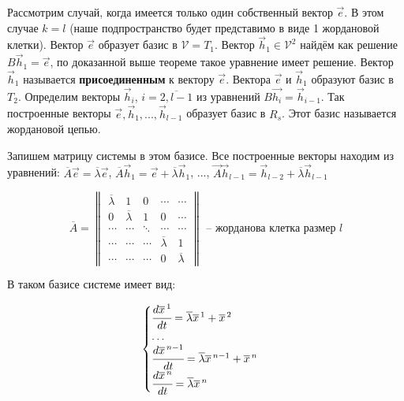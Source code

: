 Рассмотрим случай, когда имеется только один собственный вектор $\overrightarrow{e}$. В этом случае $k = l$ (наше подпространство будет представимо в виде 1 жордановой клетки). 
Вектор $\overrightarrow{e}$ образует базис в $\mathcal{V} = T_1$. Вектор $\overrightarrow{h}_1 \in \mathcal{V}^2$ найдём как решение $B \overrightarrow{h}_1 = \overrightarrow{e}$, по доказанной выше теореме такое уравнение имеет решение. 
Вектор $\overrightarrow{h}_1$ называется \textbf{присоединенным} к вектору $\overrightarrow{e}$. Вектора $\overrightarrow{e}$ и $\overrightarrow{h}_1$ образуют базис в $T_2$. 
Определим векторы $\overrightarrow{h}_i$, $i = \overline{2, l-1}$ из уравнений $B \overrightarrow{h_i} = \overrightarrow{h}_{i-1}$. Так построенные векторы $\overrightarrow{e}, \overrightarrow{h}_1, ..., \overrightarrow{h}_{l-1}$ образует базис в $R_s$. 
Этот базис называется жордановой цепью.

Запишем матрицу системы в этом базисе. Все построенные векторы находим из уравнений: 
$\overline{A}\overrightarrow{e} = \overline{\lambda} \overrightarrow{e}$, $\overline{A} \overrightarrow{h}_1 = \overrightarrow{e} + \overline{\lambda} \overrightarrow{h}_1$, ..., $\overrightarrow{A} \overrightarrow{h}_{l-1} = \overrightarrow{h}_{l-2} + \overline{\lambda} \overrightarrow{h}_{l-1}$

\[ \overline{A} =
    \begin{Vmatrix*}
        \overline{\lambda} & 1 & 0 & \cdots & \cdots      \\
        0 & \overline{\lambda} & 1 & 0 & \cdots           \\
        \cdots & \cdots & \ddots & \cdots & \cdots        \\
        \cdots & \cdots & \cdots & \overline{\lambda} & 1 \\ 
        \cdots & \cdots & \cdots & 0 & \overline{\lambda} 
    \end{Vmatrix*} \text{ -- жорданова клетка размер $l$}
\]

В таком базисе системе имеет вид:

\begin{equation}
    \begin{cases}
        \cfrac{d \overline{x}^{\,1}}{dt} = \overline{\lambda} \overline{x}^{\,1} + \overline{x}^{\,2} \\
        \ldots \\
        \cfrac{d \overline{x}^{\,n-1}}{dt} = \overline{\lambda} \overline{x}^{\,n-1} + \overline{x}^{\,n} \\
        \cfrac{d \overline{x}^{\,n}}{dt} = \overline{\lambda} \overline{x}^{\,n} \\
    \end{cases} 
\end{equation}

